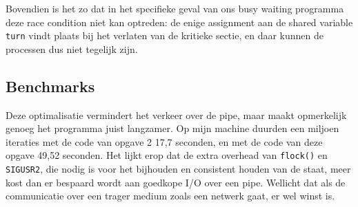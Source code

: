 \documentclass[11pt]{article}
\begin{document}
Bovendien is het zo dat in het specifieke geval van ons busy waiting programma deze race condition niet kan
optreden: de enige assignment aan de shared variable \verb+turn+ vindt plaats bij het verlaten van de kritieke
sectie, en daar kunnen de processen dus niet tegelijk zijn.

\subsection*{Benchmarks}
Deze optimalisatie vermindert het verkeer over de pipe, maar maakt opmerkelijk genoeg het programma juist langzamer.
Op mijn machine duurden een miljoen iteraties met de code van opgave 2 17,7 seconden, en met de code van deze
opgave 49,52 seconden. Het lijkt erop dat de extra overhead van \verb+flock()+ en \verb+SIGUSR2+, die nodig
is voor het bijhouden en consistent houden van de staat, meer kost dan er bespaard wordt aan goedkope I/O
over een pipe. Wellicht dat als de communicatie over een trager medium zoals een netwerk gaat, er wel winst is.
\end{document}
